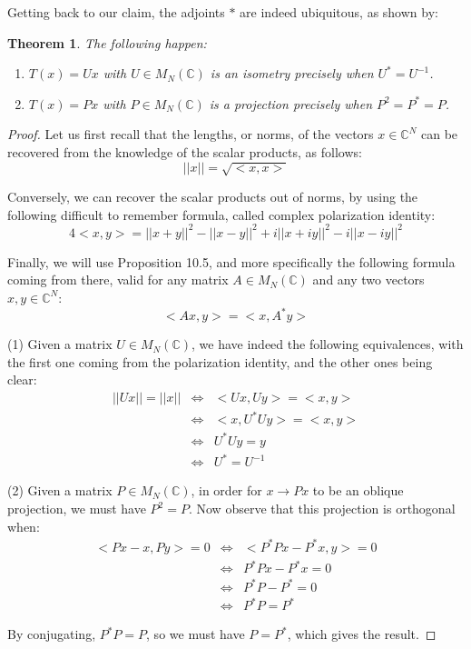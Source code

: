 \documentclass[12pt]{amsbook}
\newtheorem{theorem}{Theorem}[chapter]
\begin{document}
Getting back to our claim, the adjoints $*$ are indeed ubiquitous, as shown by:


\begin{theorem}
The following happen:
\begin{enumerate}
\item $T(x)=Ux$ with $U\in M_N(\mathbb C)$ is an isometry precisely when $U^*=U^{-1}$.

\item $T(x)=Px$ with $P\in M_N(\mathbb C)$ is a projection precisely when $P^2=P^*=P$.
\end{enumerate}
\end{theorem}

\begin{proof}
Let us first recall that the lengths, or norms, of the vectors $x\in\mathbb C^N$ can be recovered from the knowledge of the scalar products, as follows:
$$||x||=\sqrt{<x,x>}$$

Conversely, we can recover the scalar products out of norms, by using the following difficult to remember formula, called complex polarization identity:
$$4<x,y>
=||x+y||^2-||x-y||^2+i||x+iy||^2-i||x-iy||^2$$

Finally, we will use Proposition 10.5, and more specifically the following formula coming from there, valid for any matrix $A\in M_N(\mathbb C)$ and any two vectors $x,y\in\mathbb C^N$:
$$<Ax,y>=<x,A^*y>$$

(1) Given a matrix $U\in M_N(\mathbb C)$, we have indeed the following equivalences, with the first one coming from the polarization identity, and the other ones being clear:
\begin{eqnarray*}
||Ux||=||x||
&\iff&<Ux,Uy>=<x,y>\\
&\iff&<x,U^*Uy>=<x,y>\\
&\iff&U^*Uy=y\\
&\iff&U^*=U^{-1}
\end{eqnarray*}

(2) Given a matrix $P\in M_N(\mathbb C)$, in order for $x\to Px$ to be an oblique projection, we must have $P^2=P$. Now observe that this projection is orthogonal when:
\begin{eqnarray*}
<Px-x,Py>=0
&\iff&<P^*Px-P^*x,y>=0\\
&\iff&P^*Px-P^*x=0\\
&\iff&P^*P-P^*=0\\
&\iff&P^*P=P^*
\end{eqnarray*}

By conjugating, $P^*P=P$, so we must have $P=P^*$, which gives the result. 
\end{proof}
\end{document}
